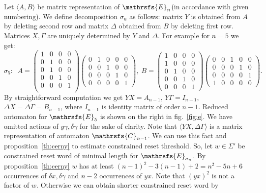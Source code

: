 \documentclass[11pt]{llncs}
\newcommand{\G}{\Gamma}
\newcommand{\D}{\Delta}
\newcommand{\g}{\gamma}
\newcommand{\dl}{\delta}
\begin{document}
Let $\langle A,B\rangle$ be matrix representation of $\mathrsfs{E}_n$(in accordance with given numbering).
We define decomposition $\sigma_n$ as follows: matrix $Y$ is obtained from $A$ by deleting second row and matrix $\D$
obtained from $B$ by deleting first row. %
Matrices $X, \G$ are uniquely 
determined by $Y$ and $\D$.
For example for $n = 5$ we get: 
$$\sigma_5: \;\;
A = 
\left(
\begin{smallmatrix}
1&0&0&0\\
0&1&0&0\\
0&1&0&0\\
0&0&1&0\\
0&0&0&1\\
\end{smallmatrix}
\right)
\left(
\begin{smallmatrix}
0&1&0&0&0\\
0&0&1&0&0\\
0&0&0&1&0\\
0&0&0&0&1
\end{smallmatrix}
\right),\;
B = 
\left(
\begin{smallmatrix}
1&0&0&0\\
1&0&0&0\\
0&1&0&0\\
0&0&1&0\\
0&0&0&1
\end{smallmatrix}
\right)
\left(
\begin{smallmatrix}
0&0&1&0&0\\
0&0&0&1&0\\
0&0&0&0&1\\
1&0&0&0&0
\end{smallmatrix}
\right).
$$
By straightforward computation we get $YX = A_{n - 1}$, $Y\G = I_{n - 1}$, $\D X = \D\G = B_{n - 1}$,
where $I_{n - 1}$ is identity matrix of order $n - 1$.
Reduced automaton for $\mathrsfs{E}_5$ is shown on the right in fig.~\ref{fig:e}.
We have omitted actions of $y\g, \dl \g$ for the sake of clarity.
Note that $\langle YX, \D\G\rangle$ is a matrix representation of automaton $\mathrsfs{C}_{n - 1}$. We can use this fact
and proposition~\ref{th:cerny} to estimate constrained reset threshold. 
So, let $w \in \Sigma'$ be constrained reset word of minimal length for $\mathrsfs{E}_{\sigma_n}$.
By proposition~\ref{th:cerny} $w$ has at least $(n - 1)^2 - 3(n - 1) + 2 = n^2 - 5n + 6$ occurrences of $\dl x, \dl \g$ and $n - 2$
occurrences of $yx$. Note that $(yx)^2$ is not a factor of $w$. Otherwise we can obtain shorter constrained reset word by 
\end{document}
